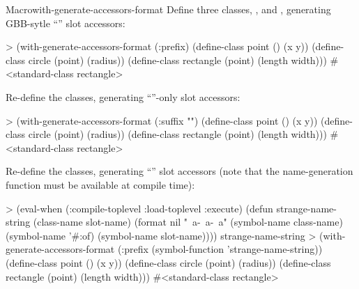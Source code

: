 \documentclass[10pt,twoside,english,pdftex]{article}
\begin{document}
\begin{functiondoc}{Macro}{with-generate-accessors-format}
\fnexamples
Define three classes, ,  and
, generating GBB-sytle
``'' slot accessors:
\begin{example}
> (with-generate-accessors-format (:prefix)
    (define-class point ()
      (x y))
    (define-class circle (point)
      (radius))
    (define-class rectangle (point)
      (length width)))
#<standard-class rectangle>
\end{example}

Re-define the classes, generating 
``''-only slot accessors:
\begin{example}
> (with-generate-accessors-format (:suffix "")
    (define-class point ()
      (x y))
    (define-class circle (point)
      (radius))
    (define-class rectangle (point)
      (length width)))
#<standard-class rectangle>
\end{example}

Re-define the classes, generating
``'' slot accessors (note that the
 name-generation function must be available at
compile time):
\begin{example}
> (eval-when (:compile-toplevel :load-toplevel :execute)
    (defun strange-name-string (class-name slot-name)
      (format nil "~a-~a-~a" 
        (symbol-name class-name) 
        (symbol-name '#:of)
        (symbol-name slot-name))))
strange-name-string
> (with-generate-accessors-format (:prefix (symbol-function 'strange-name-string))
    (define-class point ()
      (x y))
    (define-class circle (point)
      (radius))
    (define-class rectangle (point)
      (length width)))
#<standard-class rectangle>
\end{example}

\end{functiondoc}

\end{document}
